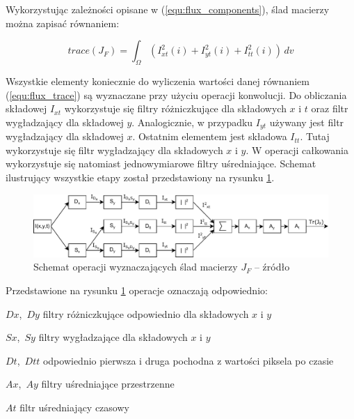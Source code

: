 Wykorzystując zależności opisane w (\ref{equ:flux_components}), ślad macierzy można zapisać równaniem:

\begin{equation}
	trace(J_F) = \int_\Omega \left(I_{xt}^2(i) + I_{yt}^2(i) + I_{tt}^2(i)\right)\,dv
\label{equ:flux_trace}
\end{equation}

Wszystkie elementy koniecznie do wyliczenia wartości danej równaniem (\ref{equ:flux_trace}) są wyznaczane przy użyciu operacji konwolucji. 
Do obliczania składowej $I_{xt}$ wykorzystuje się filtry różniczkujące dla składowych $x$ i $t$ oraz filtr wygładzający dla składowej $y$. 
Analogicznie, w przypadku $I_{yt}$ używany jest filtr wygładzający dla składowej $x$. 
Ostatnim elementem jest składowa $I_{tt}$. 
Tutaj wykorzystuje się filtr wygładzający dla składowych $x$ i $y$. 
W operacji całkowania wykorzystuje się natomiast jednowymiarowe filtry uśredniające. 
Schemat ilustrujący wszystkie etapy został przedstawiony na rysunku \ref{fig:flux_operation_flow}.

    \begin{figure}[h!]
	\centering
	    \includegraphics[scale=0.8]{img/3/flux_operation_flow.pdf}
	    \caption{Schemat operacji wyznaczających ślad macierzy $J_F$ -- źródło \cite{janus_15}}
	\label{fig:flux_operation_flow}
    \end{figure} 

\noindent Przedstawione na rysunku \ref{fig:flux_operation_flow} operacje oznaczają odpowiednio: 
\begin{eqwhere}[2cm]
	\item[$Dx$,\  $Dy$] filtry różniczkujące odpowiednio dla składowych $x$ i $y$
	\item[$Sx$,\  $Sy$] filtry wygładzające dla składowych $x$ i $y$
	\item[$Dt$,\  $Dtt$] odpowiednio pierwsza i druga pochodna z wartości piksela po czasie
	\item[$Ax$,\  $Ay$] filtry uśredniające przestrzenne
	\item[$At$] filtr uśredniający czasowy\\
\end{eqwhere}

